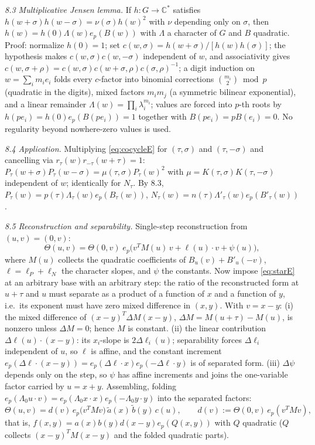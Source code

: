 \documentclass[11pt]{article}
\begin{document}
\emph{8.3 Multiplicative Jensen lemma.} If $h:G\to\mathbb{C}^*$ satisfies
$h(w+\sigma)h(w-\sigma)=\nu(\sigma)h(w)^2$ with $\nu$ depending only on
$\sigma$, then $h(w)=h(0)\Lambda(w)e_p(B(w))$ with $\Lambda$ a character of
$G$ and $B$ quadratic. Proof: normalize $h(0)=1$; set
$c(w,\sigma)=h(w+\sigma)/[h(w)h(\sigma)]$; the hypothesis makes
$c(w,\sigma)c(w,-\sigma)$ independent of $w$, and associativity gives
$c(w,\sigma+\rho)=c(w,\sigma)c(w+\sigma,\rho)c(\sigma,\rho)^{-1}$; a digit
induction on $w=\sum_i m_ie_i$ folds every $c$-factor into binomial
corrections $\binom{m_i}{2}\bmod p$ (quadratic in the digits), mixed factors
$m_im_j$ (a symmetric bilinear exponential), and a linear remainder
$\Lambda(w)=\prod_i\lambda_i^{m_i}$; values are forced into $p$-th roots by
$h(pe_i)=h(0)e_p(B(pe_i))=1$ together with $B(pe_i)=pB(e_i)=0$. No
regularity beyond nowhere-zero values is used.

\emph{8.4 Application.} Multiplying \eqref{eq:cocycleE} for $(\tau,\sigma)$
and $(\tau,-\sigma)$ and cancelling via $r_\tau(w)r_{-\tau}(w+\tau)=1$:
$P_\tau(w+\sigma)P_\tau(w-\sigma)=\mu(\tau,\sigma)P_\tau(w)^2$ with
$\mu=K(\tau,\sigma)K(\tau,-\sigma)$ independent of $w$; identically for
$N_\tau$. By 8.3,
$P_\tau(w)=p(\tau)\Lambda_\tau(w)e_p(B_\tau(w))$,
$N_\tau(w)=n(\tau)\Lambda'_\tau(w)e_p(B'_\tau(w))$.

\emph{8.5 Reconstruction and separability.} Single-step reconstruction from
$(u,v)=(0,v)$:
\[
\Theta(u,v)=\Theta(0,v)\;e_p\bigl(v^{T}M(u)\,v+\ell(u)\cdot v+\psi(u)\bigr),
\]
where $M(u)$ collects the quadratic coefficients of
$B_u(v)+B'_u(-v)$, $\ell=\ell_P+\ell_N$ the character slopes, and $\psi$ the
constants. Now impose \eqref{eq:starE} at an arbitrary base with an arbitrary
step: the ratio of the reconstructed form at $u+\tau$ and $u$ must separate
as a product of a function of $x$ and a function of $y$, i.e.\ its exponent
must have zero mixed difference in $(x,y)$. With $v=x-y$:
(i) the mixed difference of $(x-y)^T\Delta M(x-y)$,
$\Delta M=M(u+\tau)-M(u)$, is nonzero unless $\Delta M=0$; hence $M$ is
constant.
(ii) the linear contribution $\Delta\ell(u)\cdot(x-y)$: its $x_i$-slope is
$2\Delta\ell_i(u)$; separability forces $\Delta\ell_i$ independent of $u$,
so $\ell$ is affine, and the constant increment
$e_p(\Delta\ell\cdot(x-y))=e_p(\Delta\ell\cdot x)e_p(-\Delta\ell\cdot y)$ is
of separated form.
(iii) $\Delta\psi$ depends only on the step, so $\psi$ has affine increments
and joins the one-variable factor carried by $u=x+y$.
Assembling, folding
$e_p(\Lambda_0 u\cdot v)=e_p(\Lambda_0 x\cdot x)e_p(-\Lambda_0 y\cdot y)$
into the separated factors:
\[
\Theta(u,v)=d(v)\,e_p\bigl(v^{T}Mv\bigr)\,\tilde a(x)\,\tilde b(y)\,c(u),
\qquad d(v):=\Theta(0,v)\,e_p(v^{T}Mv),
\]
that is,
$f(x,y)=a(x)b(y)d(x-y)e_p(Q(x,y))$ with $Q$ quadratic ($Q$ collects
$(x-y)^TM(x-y)$ and the folded quadratic parts).
\end{document}
